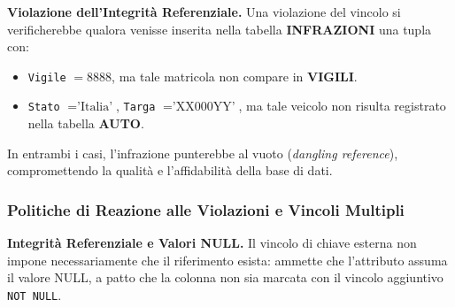 \documentclass[12pt]{extarticle}
\begin{document}
\medskip
\noindent \textbf{Violazione dell'Integrità Referenziale.} Una violazione del vincolo si verificherebbe qualora venisse inserita nella tabella \textbf{INFRAZIONI} una tupla con:
\begin{itemize}
    \item \texttt{Vigile} $= 8888$, ma tale matricola non compare in \textbf{VIGILI}.
    \item \texttt{Stato} $= \text{'Italia'}$, \texttt{Targa} $= \text{'XX000YY'}$, ma tale veicolo non risulta registrato nella tabella \textbf{AUTO}.
\end{itemize}
In entrambi i casi, l'infrazione punterebbe al vuoto (\textit{dangling reference}), compromettendo la qualità e l'affidabilità della base di dati.

\subsubsection{Politiche di Reazione alle Violazioni e Vincoli Multipli}
\noindent \textbf{Integrità Referenziale e Valori NULL.} Il vincolo di chiave esterna non impone necessariamente che il riferimento esista: ammette che l'attributo assuma il valore NULL, a patto che la colonna non sia marcata con il vincolo aggiuntivo \texttt{NOT NULL}.
\end{document}
